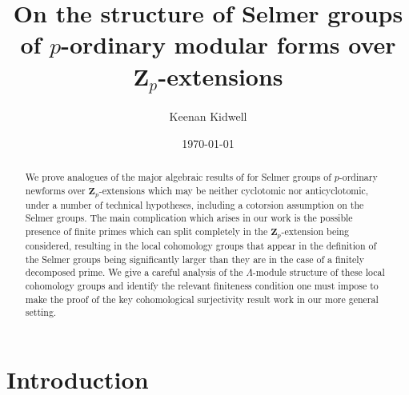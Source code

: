 \documentclass[12 pt]{amsart}
\title{On the structure of Selmer groups of $p$-ordinary modular forms over $\mathbf{Z}_p$-extensions}
\author{Keenan Kidwell}
\date{\today}
\theoremstyle{plain}
\theoremstyle{definition}
\numberwithin{equation}{section}
\numberwithin{table}{section}
\begin{document}
\maketitle

\begin{abstract}
We prove analogues of the major algebraic results of \cite{GV00} for Selmer groups of $p$-ordinary newforms over $\mathbf{Z}_p$-extensions which may be neither cyclotomic nor anticyclotomic, under a number of technical hypotheses, including a cotorsion assumption on the Selmer groups. The main complication which arises in our work is the possible presence of finite primes which can split completely in the $\mathbf{Z}_p$-extension being considered, resulting in the local cohomology groups that appear in the definition of the Selmer groups being significantly larger than they are in the case of a finitely decomposed prime. We give a careful analysis of the $\Lambda$-module structure of these local cohomology groups and identify the relevant finiteness condition one must impose to make the proof of the key cohomological surjectivity result \cite[Proposition 2.1]{GV00} work in our more general setting.
\end{abstract}

\section{Introduction}
\label{intro}
\end{document}
